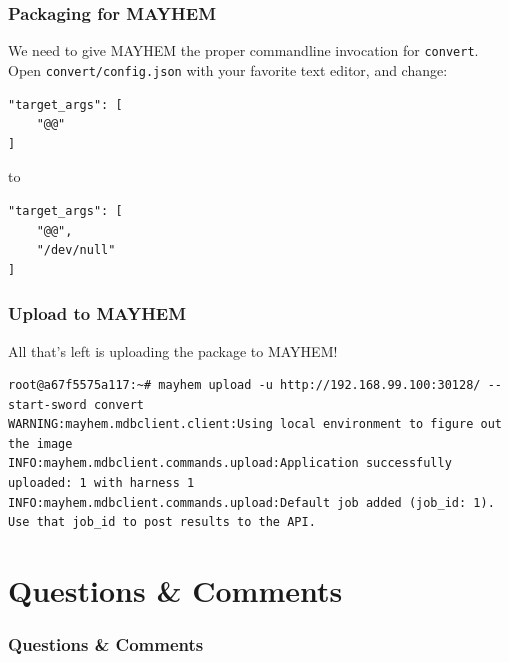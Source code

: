 \documentclass{beamer}
\begin{document}
\begin{frame}[fragile]
\frametitle{Packaging for MAYHEM}
We need to give MAYHEM the proper commandline invocation for \texttt{convert}.
Open \texttt{convert/config.json} with your favorite text editor, and change:

\begin{lstlisting}
"target_args": [
    "@@"
]
\end{lstlisting}

to

\begin{lstlisting}
"target_args": [
    "@@",
    "/dev/null"
]
\end{lstlisting}
\end{frame}


\begin{frame}[fragile]
\frametitle{Upload to MAYHEM}
All that’s left is uploading the package to MAYHEM!

\begin{lstlisting}
root@a67f5575a117:~# mayhem upload -u http://192.168.99.100:30128/ --start-sword convert
WARNING:mayhem.mdbclient.client:Using local environment to figure out the image
INFO:mayhem.mdbclient.commands.upload:Application successfully uploaded: 1 with harness 1
INFO:mayhem.mdbclient.commands.upload:Default job added (job_id: 1). Use that job_id to post results to the API.
\end{lstlisting}
\end{frame}

\section{Questions \& Comments}

\begin{frame}
\frametitle{Questions \& Comments}
\end{frame}
\end{document}
